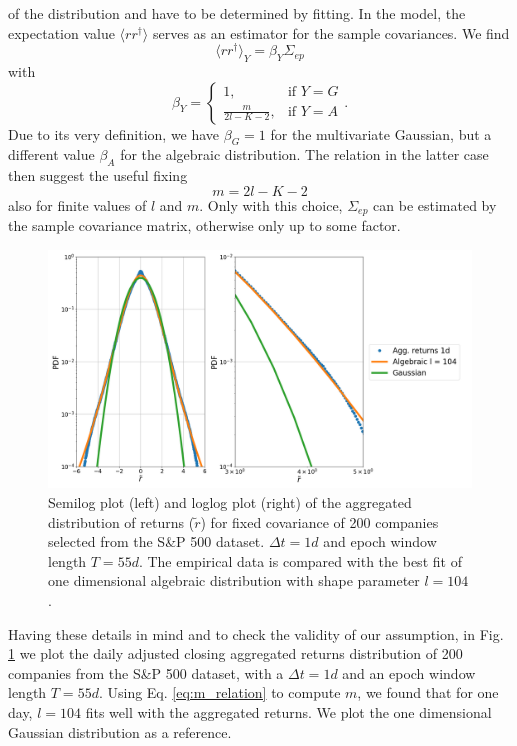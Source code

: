 of the distribution and have to be determined by fitting. In the model, the
expectation value $\langle r r^{\dagger} \rangle$ serves as an estimator for
the sample covariances. We find
\begin{equation}
    \langle r r^{\dagger} \rangle_{Y} = \beta_{Y} \Sigma_{ep}
\end{equation}
with
\begin{equation}
    \beta_{Y}=\begin{cases}
    1, & \text{if }Y=G\\
    \frac{m}{2l-K-2}, & \text{if }Y=A
\end{cases}.
\end{equation}
Due to its very definition, we have $\beta_{G} = 1$ for the multivariate
Gaussian, but a different value $\beta_{A}$ for the algebraic distribution. The
relation in the latter case then suggest the useful fixing
\begin{equation}\label{eq:m_relation}
    m = 2l - K - 2
\end{equation}
also for finite values of $l$ and $m$. Only with this choice, $\Sigma_{ep}$ can
be estimated by the sample covariance matrix, otherwise only up to some factor.

\begin{figure}[htbp]
    \centering
    \includegraphics[width=0.7\columnwidth]
    {figures/05_algebraic_agg_returns_short_epoch.png}
    \caption{Semilog plot (left) and loglog plot (right) of the aggregated
             distribution of returns ($\tilde{r}$) for fixed covariance of 200
             companies selected from the S\&P 500 dataset. $\Delta t = 1d$ and
             epoch window length $T=55d$. The empirical data is compared with
             the best fit of one dimensional algebraic distribution with shape
             parameter $l=104$.}
    \label{fig:algebraic_agg_returns_epoch}
\end{figure}

Having these details in mind and to check the validity of our assumption, in
Fig. \ref{fig:algebraic_agg_returns_epoch} we plot the daily adjusted closing
aggregated returns distribution of 200 companies from the S\&P 500 dataset,
with a $\Delta t = 1d$ and an epoch window length $T = 55d$. Using Eq.
\ref{eq:m_relation} to compute $m$, we found that for one day, $l = 104$ fits
well with the aggregated returns. We plot the one dimensional Gaussian
distribution as a reference.

